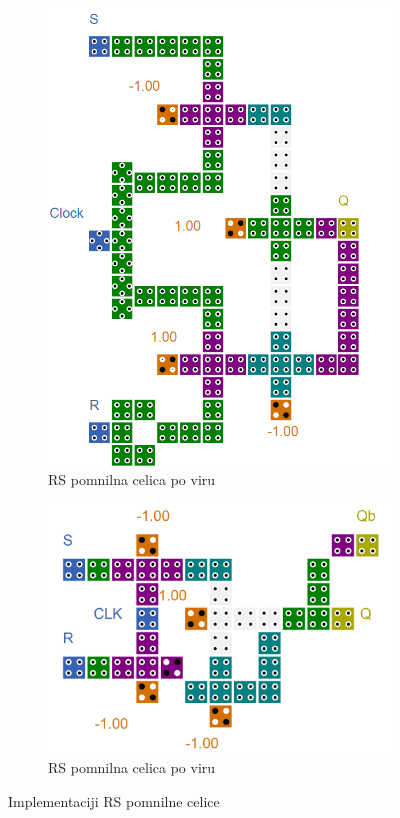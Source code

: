 \documentclass[a4paper, 11pt]{article}
\begin{document}
\begin{figure}[h!]
	\centering
	\begin{subfigure}[b]{0.4\textwidth}
	\includegraphics[width=\textwidth]{../img/vir_4/sr.png}
	\caption{RS pomnilna celica po viru \cite{quantum_dot}}
	\label{fig-rs-1}
	\end{subfigure}
	\begin{subfigure}[b]{0.4\textwidth}
	\includegraphics[width=\textwidth]{../img/vir_5/rs.png} 
	\caption{RS pomnilna celica po viru \cite{a_novel_approach}}
	\label{fig-rs-2}
	\end{subfigure}
	\caption{Implementaciji RS pomnilne celice}
	\label{fig-rs}
\end{figure}
\end{document}
